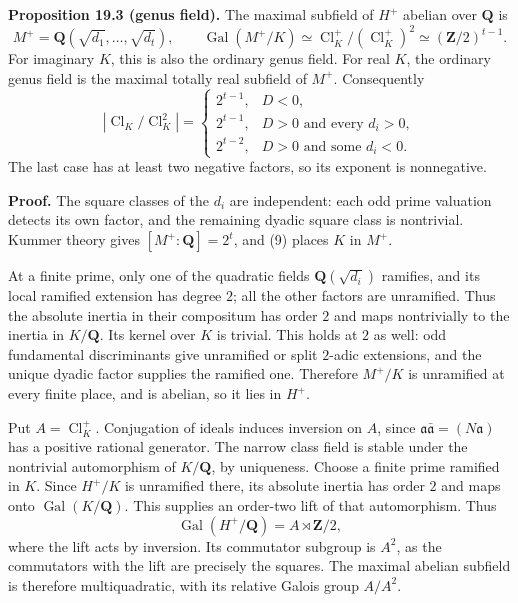 \documentclass[11pt,a4paper]{article}
\begin{document}
\textbf{Proposition 19.3 (genus field).} The maximal subfield of \(H^+\)
abelian over \(\mathbf Q\) is \[
M^+=\mathbf Q(\sqrt{d_1},\ldots,\sqrt{d_t}),
\qquad
\operatorname{Gal}(M^+/K)\simeq
\operatorname{Cl}_K^+/(\operatorname{Cl}_K^+)^2
\simeq(\mathbf Z/2)^{t-1}.
\tag{10}
\] For imaginary \(K\), this is also the ordinary genus field. For real
\(K\), the ordinary genus field is the maximal totally real subfield of
\(M^+\). Consequently \[
|\operatorname{Cl}_K/\operatorname{Cl}_K^2|=
\begin{cases}
2^{t-1},&D<0,\\
2^{t-1},&D>0\text{ and every }d_i>0,\\
2^{t-2},&D>0\text{ and some }d_i<0.
\end{cases}
\tag{11}
\] The last case has at least two negative factors, so its exponent is
nonnegative.

\textbf{Proof.} The square classes of the \(d_i\) are independent: each
odd prime valuation detects its own factor, and the remaining dyadic
square class is nontrivial. Kummer theory gives \([M^+:\mathbf Q]=2^t\),
and (9) places \(K\) in \(M^+\).

At a finite prime, only one of the quadratic fields
\(\mathbf Q(\sqrt{d_i})\) ramifies, and its local ramified extension has
degree \(2\); all the other factors are unramified. Thus the absolute
inertia in their compositum has order \(2\) and maps nontrivially to the
inertia in \(K/\mathbf Q\). Its kernel over \(K\) is trivial. This holds
at \(2\) as well: odd fundamental discriminants give unramified or split
\(2\)-adic extensions, and the unique dyadic factor supplies the
ramified one. Therefore \(M^+/K\) is unramified at every finite place,
and is abelian, so it lies in \(H^+\).

Put \(A=\operatorname{Cl}_K^+\). Conjugation of ideals induces inversion
on \(A\), since \(\mathfrak a\bar{\mathfrak a}=(N\mathfrak a)\) has a
positive rational generator. The narrow class field is stable under the
nontrivial automorphism of \(K/\mathbf Q\), by uniqueness. Choose a
finite prime ramified in \(K\). Since \(H^+/K\) is unramified there, its
absolute inertia has order \(2\) and maps onto
\(\operatorname{Gal}(K/\mathbf Q)\). This supplies an order-two lift of
that automorphism. Thus \[
\operatorname{Gal}(H^+/\mathbf Q)=A\rtimes\mathbf Z/2,
\] where the lift acts by inversion. Its commutator subgroup is \(A^2\),
as the commutators with the lift are precisely the squares. The maximal
abelian subfield is therefore multiquadratic, with its relative Galois
group \(A/A^2\).
\end{document}
